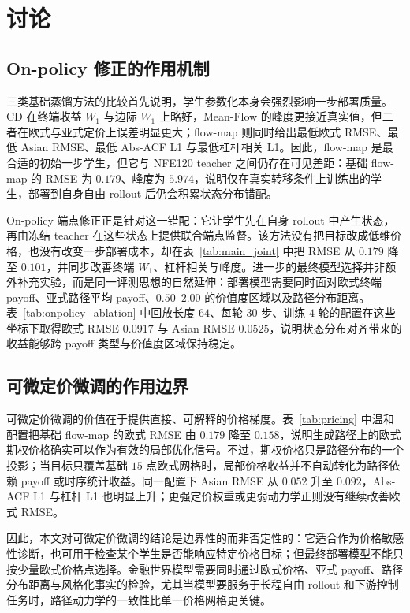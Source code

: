\documentclass[11pt]{ctexart}
\begin{document}
\section{讨论}
\label{sec:discussion}

\subsection{On-policy 修正的作用机制}
三类基础蒸馏方法的比较首先说明，学生参数化本身会强烈影响一步部署质量。CD 在终端收益 $W_1$ 与边际 $W_1$ 上略好，Mean-Flow 的峰度更接近真实值，但二者在欧式与亚式定价上误差明显更大；flow-map 则同时给出最低欧式 RMSE、最低 Asian RMSE、最低 Abs-ACF L1 与最低杠杆相关 L1。因此，flow-map 是最合适的初始一步学生，但它与 NFE120 teacher 之间仍存在可见差距：基础 flow-map 的 RMSE 为 $0.179$、峰度为 $5.974$，说明仅在真实转移条件上训练出的学生，部署到自身自由 rollout 后仍会积累状态分布错配。

On-policy 端点修正正是针对这一错配：它让学生先在自身 rollout 中产生状态，再由冻结 teacher 在这些状态上提供联合端点监督。该方法没有把目标改成低维价格，也没有改变一步部署成本，却在表~\ref{tab:main_joint} 中把 RMSE 从 $0.179$ 降至 $0.101$，并同步改善终端 $W_1$、杠杆相关与峰度。进一步的最终模型选择并非额外补充实验，而是同一评测思想的自然延伸：部署模型需要同时面对欧式终端 payoff、亚式路径平均 payoff、$0.50$--$2.00$ 的价值度区域以及路径分布距离。表~\ref{tab:onpolicy_ablation} 中回放长度 $64$、每轮 $30$ 步、训练 $4$ 轮的配置在这些坐标下取得欧式 RMSE $0.0917$ 与 Asian RMSE $0.0525$，说明状态分布对齐带来的收益能够跨 payoff 类型与价值度区域保持稳定。

\subsection{可微定价微调的作用边界}
可微定价微调的价值在于提供直接、可解释的价格梯度。表~\ref{tab:pricing} 中温和配置把基础 flow-map 的欧式 RMSE 由 $0.179$ 降至 $0.158$，说明生成路径上的欧式期权价格确实可以作为有效的局部优化信号。不过，期权价格只是路径分布的一个投影；当目标只覆盖基础 $15$ 点欧式网格时，局部价格收益并不自动转化为路径依赖 payoff 或时序统计收益。同一配置下 Asian RMSE 从 $0.052$ 升至 $0.092$，Abs-ACF L1 与杠杆 L1 也明显上升；更强定价权重或更弱动力学正则没有继续改善欧式 RMSE。

因此，本文对可微定价微调的结论是边界性的而非否定性的：它适合作为价格敏感性诊断，也可用于检查某个学生是否能响应特定价格目标；但最终部署模型不能只按少量欧式价格点选择。金融世界模型需要同时通过欧式价格、亚式 payoff、路径分布距离与风格化事实的检验，尤其当模型要服务于长程自由 rollout 和下游控制任务时，路径动力学的一致性比单一价格网格更关键。
\end{document}
